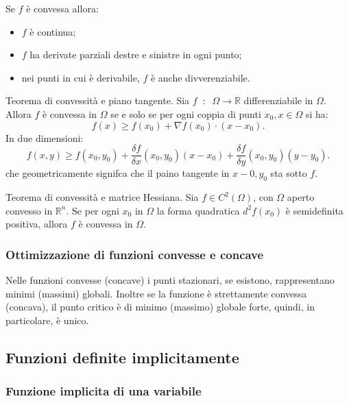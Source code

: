Se $f$ è convessa allora:
\begin{itemize}
    \item $f$ è continua;
    \item $f$ ha derivate parziali destre e sinistre in ogni punto;
    \item nei punti in cui è derivabile, $f$ è anche divverenziabile.
\end{itemize}

Teorema di convessità e piano tangente. Sia $f \;\;:\;\; \Omega \rightarrow \mathbb{R}$ differenziabile in $\Omega$. Allora $f$ è convessa in $\Omega$ se e solo se per ogni coppia di punti $x_0, x \in \Omega$ si ha:
\[
    f(x) \geq f(x_0) + \nabla f(x_0) \cdot (x-x_0).
\]
In due dimensioni:
\[
    f(x,y) \geq f(x_0,y_0) + \frac{\delta f}{\delta x}(x_0,y_0)(x-x_0)+\frac{\delta f}{\delta y}(x_0, y_0)(y-y_0).
\]
che geometricamente signifca che il paino tangente in $x-0, y_0$ sta sotto $f$.\newline

Teorema di convessità e matrice Hessiana. Sia $f \in C^2(\Omega)$, con $\Omega$ aperto convesso in $\mathbb{R}^n$. Se per ogni $x_0$ in $\Omega$ la forma quadratica $d^2f(x_0)$ è semidefinita positiva, allora $f$ è convessa in $\Omega$.
\subsubsection*{Ottimizzazione di funzioni convesse e concave}
Nelle funzioni convesse (concave) i punti stazionari, se esistono, rappresentano minimi (massimi) globali. Inoltre se la funzione è strettamente convessa (concava), il punto critico è di minimo (massimo) globale forte, quindi, in particolare, è unico.
\subsection*{Funzioni definite implicitamente}
\subsubsection*{Funzione implicita di una variabile}

